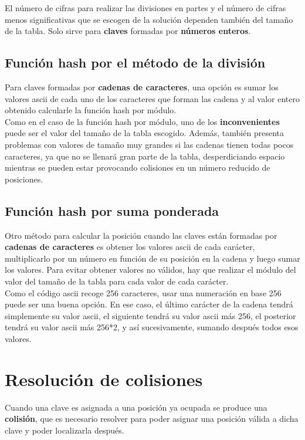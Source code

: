 \documentclass{article}
\begin{document}
El número de cifras para realizar las divisiones en partes y el número de cifras menos significativas que se escogen de la solución dependen también del tamaño de la tabla. Solo sirve para \textbf{claves} formadas por \textbf{números enteros}. \\

\subsection{Función hash por el método de la división}
Para claves formadas por \textbf{cadenas de caracteres}, una opción es sumar los valores ascii de cada uno de los caracteres que forman las cadena y al valor entero obtenido calcularle la función hash por módulo. \\

Como en el caso de la función hash por módulo, uno de los \textbf{inconvenientes} puede ser el valor del tamaño de la tabla escogido. Además, también presenta problemas con valores de tamaño muy grandes si las cadenas tienen todas pocos caracteres, ya que no se llenará gran parte de la tabla, desperdiciando espacio mientras se pueden estar provocando colisiones en un
número reducido de posiciones. \\

\newpage

\subsection{Función hash por suma ponderada}
Otro método para calcular la posición cuando las claves están formadas por \textbf{cadenas de caracteres} es obtener los valores ascii de cada carácter, multiplicarlo por un número en función de su posición en la cadena y luego sumar los valores. Para evitar obtener valores no válidos, hay que realizar el módulo del valor del tamaño de la tabla para cada valor de cada carácter. \\

Como el código ascii recoge 256 caracteres, usar una numeración en base 256 puede ser una buena opción. En ese caso, el último carácter de la cadena tendrá simplemente su valor ascii, el siguiente tendrá su valor ascii más 256, el posterior tendrá su valor ascii más 256*2, y así sucesivamente, sumando después todos esos valores. \\

\section{Resolución de colisiones}
Cuando una clave es asignada a una posición ya ocupada se produce una \textbf{colisión}, que es necesario resolver para poder asignar una posición válida a dicha clave y poder localizarla después. \\
\end{document}
